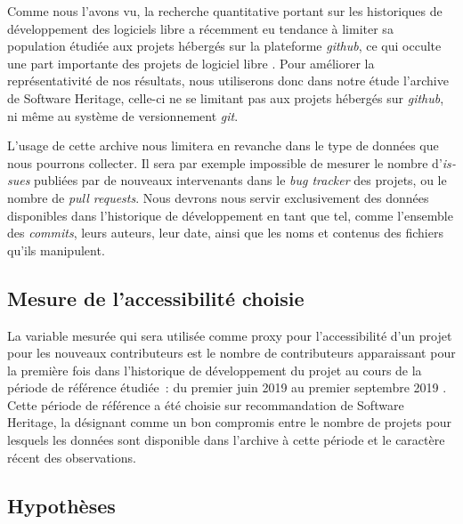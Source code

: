 \documentclass[dvipsnames]{llncs}
\newcommand{\en}[1]{\foreignlanguage{english}{\emph{#1}}}
\newtheorem{hypo}{Hypothèse}[theorem]
\begin{document}
    Comme nous l'avons vu, la recherche quantitative portant sur les historiques de développement des
    logiciels libre a récemment eu tendance à limiter sa population étudiée aux projets hébergés sur la
    plateforme \en{github}, ce qui occulte une part importante des projets de logiciel libre
    \parencites{mining-github-2014}{penumbra-oss-2022}. Pour améliorer la représentativité de nos résultats,
    nous utiliserons donc dans notre étude l'archive de Software Heritage, celle-ci ne se limitant pas aux
    projets hébergés sur \en{github}, ni même au système de versionnement \en{git}.

    L'usage de cette archive nous limitera en revanche dans le type de données que nous pourrons collecter. Il
    sera par exemple impossible de mesurer le nombre d'\en{issues} publiées par de nouveaux intervenants dans
    le \en{bug tracker} des projets, ou le nombre de \en{pull requests}. Nous devrons nous servir
    exclusivement des données disponibles dans l'historique de développement en tant que tel, comme l'ensemble
    des \en{commits}, leurs auteurs, leur date, ainsi que les noms et contenus des fichiers qu'ils manipulent.

    \subsection{Mesure de l'accessibilité choisie}

    La variable mesurée qui sera utilisée comme proxy pour l'accessibilité d'un projet pour les nouveaux
    contributeurs est le nombre de contributeurs apparaissant pour la première fois dans l'historique de
    développement du projet au cours de la période de référence étudiée : du premier juin 2019 au premier
    septembre 2019 \parencite[voir section \ref{sec:accessibility-measure}, ainsi
    que][p.~13,16]{signals-2019}. Cette période de référence a été choisie sur recommandation de Software
    Heritage, la désignant comme un bon compromis entre le nombre de projets pour lesquels les données sont
    disponible dans l'archive à cette période et le caractère récent des observations.

    \subsection{Hypothèses}

    \newcommand{\newhyp}[2]{%
        \begin{hypo}
            \label{hyp:#1}#2
        \end{hypo}%
    }
\end{document}
